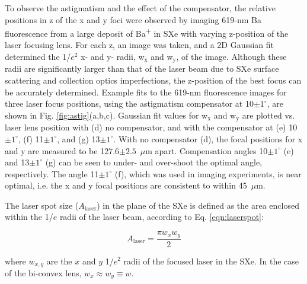 To observe the astigmatism and the effect of the compensator, the relative positions in z of the x and y foci were observed by imaging 619-nm Ba fluorescence from a large deposit of Ba\textsuperscript{+} in SXe with varying z-position of the laser focusing lens.  For each z, an image was taken, and a 2D Gaussian fit determined the 1/$e^{2}$ x- and y- radii, w$_{\text{x}}$ and w$_{\text{y}}$, of the image.  Although these radii are significantly larger than that of the laser beam due to SXe surface scattering and collection optics imperfections, the z-position of the best focus can be accurately determined.  Example fits to the 619-nm fluorescence images for three laser focus positions, using the astigmatism compensator at 10$\pm 1^{\circ}$, are shown in Fig. \ref{fig:astig}(a,b,c).  Gaussian fit values for w$_{\text{x}}$ and w$_{\text{y}}$ are plotted vs. laser lens position with (d) no compensator, and with the compensator at (e) 10$\pm 1^{\circ}$, (f) 11$\pm 1^{\circ}$, and (g) 13$\pm 1^{\circ}$.  With no compensator (d), the focal positions for x and y are measured to be 127.6$ \pm 2.5$~$\mu$m apart.  Compensation angles 10$\pm 1^{\circ}$ (e) and 13$\pm 1^{\circ}$ (g) can be seen to under- and over-shoot the optimal angle, respectively.  The angle 11$\pm 1^{\circ}$ (f), which was used in imaging experiments, is near optimal, i.e. the x and y focal positions are consistent to within 45~$\mu$m.  %

The laser spot size ($A_{\text{laser}}$) in the plane of the SXe is defined as the area enclosed within the 1/$e$ radii of the laser beam, according to Eq. \ref{eqn:laserspot}:

\begin{equation}
A_{\text{laser}} = \frac{\pi w_{x} w_{y}}{2}
\label{eqn:laserspot}
\end{equation}

\noindent
where $w_{x,y}$ are the $x$ and $y$ 1/$e^{2}$ radii of the focused laser in the SXe.  In the case of the bi-convex lens, $w_{x} \approx w_{y} \equiv w$.



